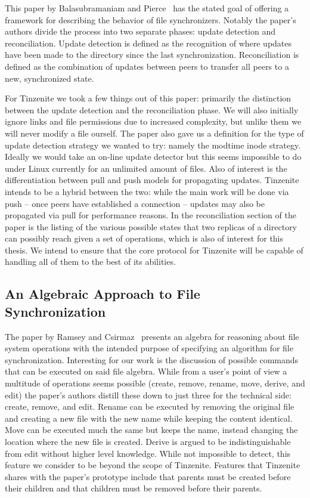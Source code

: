 This paper by Balasubramaniam and Pierce~\cite{balasubramaniam1998file} has the stated goal of offering a framework for describing the behavior of file synchronizers.
Notably the paper's authors divide the process into two separate phases: update detection and reconciliation.
Update detection is defined as the recognition of where updates have been made to the directory since the last synchronization.
Reconciliation is defined as the combination of updates between peers to transfer all peers to a new, synchronized state.

For Tinzenite we took a few things out of this paper: primarily the distinction between the update detection and the reconciliation phase.
We will also initially ignore links and file permissions due to increased complexity, but unlike them we will never modify a file ourself.
The paper also gave us a definition for the type of update detection strategy we wanted to try: namely the modtime inode strategy.
Ideally we would take an on-line update detector but this seems impossible to do under Linux currently for an unlimited amount of files.
Also of interest is the differentiation between pull and push models for propagating updates.
Tinzenite intends to be a hybrid between the two: while the main work will be done via push -- once peers have established a connection -- updates may also be propagated via pull for performance reasons.
In the reconciliation section of the paper is the listing of the various possible states that two replicas of a directory can possibly reach given a set of operations, which is also of interest for this thesis.
We intend to ensure that the core protocol for Tinzenite will be capable of handling all of them to the best of its abilities.

\subsection{An Algebraic Approach to File Synchronization}
\label{sub:An Algebraic Approach to File Synchronization}

The paper by Ramsey and Csirmaz~\cite{ramsey2001algebraic} presents an algebra for reasoning about file system operations with the intended purpose of specifying an algorithm for file synchronization.
Interesting for our work is the discussion of possible commands that can be executed on said file algebra.
While from a user's point of view a multitude of operations seems possible (create, remove, rename, move, derive, and edit) the paper's authors distill these down to just three for the technical side: create, remove, and edit.
Rename can be executed by removing the original file and creating a new file with the new name while keeping the content identical.
Move can be executed much the same but keeps the name, instead changing the location where the new file is created.
Derive is argued to be indistinguishable from edit without higher level knowledge.
While not impossible to detect, this feature we consider to be beyond the scope of Tinzenite.
Features that Tinzenite shares with the paper's prototype include that parents must be created before their children and that children must be removed before their parents.

